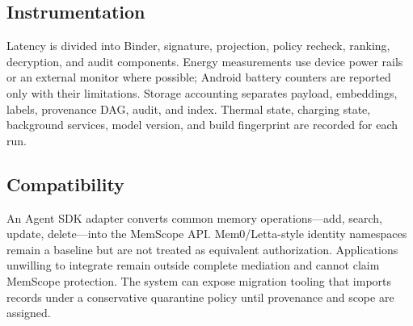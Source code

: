 \subsection{Instrumentation}

Latency is divided into Binder, signature, projection, policy recheck, ranking, decryption, and audit components. Energy measurements use device power rails or an external monitor where possible; Android battery counters are reported only with their limitations. Storage accounting separates payload, embeddings, labels, provenance DAG, audit, and index. Thermal state, charging state, background services, model version, and build fingerprint are recorded for each run.

\subsection{Compatibility}

An Agent SDK adapter converts common memory operations---add, search, update, delete---into the MemScope API. Mem0/Letta-style identity namespaces remain a baseline but are not treated as equivalent authorization. Applications unwilling to integrate remain outside complete mediation and cannot claim MemScope protection. The system can expose migration tooling that imports records under a conservative quarantine policy until provenance and scope are assigned.
